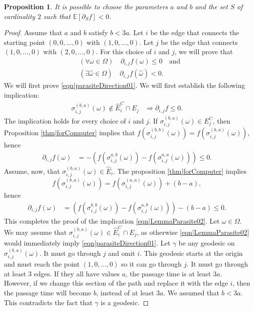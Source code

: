 \documentclass[reqno]{amsart}
\newtheorem{proposition}{Proposition}
\begin{document}
\begin{proposition}\label{thm|Parasite}
It is possible to choose the parameters $a$ and $b$ and the set $S$ of cardinality $2$ such that $\mathbb E[\partial_Sf]<0$.
\end{proposition}
\begin{proof}
Assume that $a$ and $b$ satisfy $b<3a$. Let $i$ be the edge that connects the starting point $(0,0,\dots, 0)$ with $(1,0,\dots, 0)$. Let $j$ be 
the edge that connects $(1,0,\dots, 0)$ with $(2,0,\dots, 0)$. For this choice of $i$ and $j$, we will prove that 
\begin{align}
&\left(\forall \omega\in\Omega\right) \quad \partial_{i,j}f(\omega)\leq 0 \quad\text{and} 
\label{eqn|parasiteDirection01}\\
&\left(\exists\hat\omega\in\Omega\right) \quad \partial_{i,j}f(\hat\omega)<0. \label{eqn|parasiteDirection02}\end{align} 
We will first prove 
\eqref{eqn|parasiteDirection01}. 
We will first establish the following implication:
\begin{align} 
\sigma_{i,j}^{(b,a)}(\omega)\not\in \hat E_i^C\cap E_j&\Longrightarrow  \partial_{i,j} f\leq 0.\label{eqn|LemmaParasite02}
\end{align}
The implication holds for every choice of $i$ and $j$. 
If $\sigma_{i,j}^{(b,a)}(\omega)\in E_j^C$, then Proposition \ref{thm|forComputer} implies that $f(\sigma_{i,j}^{(b,b)}(\omega))=f (\sigma_{i,j}^{(b,a)}(\omega) )$, hence 
\begin{align*}
\partial_{i,j}f(\omega)&=-\left(f(\sigma_{i,j}^{a,b}(\omega))-f(\sigma_{i,j}^{a,a}(\omega))\right)\leq 0.
\end{align*}
Assume, now, that  $\sigma_{i,j}^{(b,a)}(\omega)\in \hat E_i$. The proposition \ref{thm|forComputer} implies \[f(\sigma_{i,j}^{(b,a)}(\omega))=f (\sigma_{i,j}^{(a,a)}(\omega) )+(b-a),\] hence 
\begin{align*}
\partial_{i,j}f(\omega)&= \left(f(\sigma_{i,j}^{b,b}(\omega))-f(\sigma_{i,j}^{a,b}(\omega))\right)-(b-a)\leq 0.
\end{align*}
This completes the proof of the implication \eqref{eqn|LemmaParasite02}.  
Let $\omega\in\Omega$. We may assume that  
$\sigma_{i,j}^{(b,a)}(\omega)\in \hat E_i^C\cap E_j$, as otherwise \eqref{eqn|LemmaParasite02} would immediately imply \eqref{eqn|parasiteDirection01}.  
Let $\gamma$ be any geodesic on $\sigma_{i,j}^{(b,a)}(\omega)$. 
It must go through $j$ and omit $i$. This geodesic starts at the origin and must 
reach the point $(1,0,\dots, 0)$ so it can go through $j$. It must go through at least $3$ edges. If they all have values $a$, the passage time is at least $3a$. However, if we change this section of the path and replace it with the edge $i$, then the passage time will become $b$, instead of at least $3a$. We assumed that $b<3a$. This contradicts the fact that $\gamma$ is a geodesic. 


\end{proof}
\end{document}
